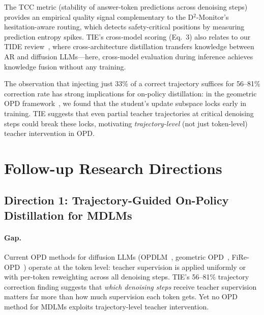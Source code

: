 \documentclass[11pt,a4paper]{article}
\begin{document}
The TCC metric (stability of answer-token predictions across denoising steps) provides an empirical quality signal complementary to the D$^2$-Monitor's~\cite{liu2026d2monitor} hesitation-aware routing, which detects safety-critical positions by measuring prediction entropy spikes. TIE's cross-model scoring (Eq.~3) also relates to our TIDE review~\cite{li2026tide}, where cross-architecture distillation transfers knowledge between AR and diffusion LLMs---here, cross-model evaluation during inference achieves knowledge fusion without any training.

The observation that injecting just 33\% of a correct trajectory suffices for 56--81\% correction rate has strong implications for on-policy distillation: in the geometric OPD framework~\cite{shen2026geometry}, we found that the student's update subspace locks early in training. TIE suggests that even partial teacher trajectories at critical denoising steps could break these locks, motivating \emph{trajectory-level} (not just token-level) teacher intervention in OPD.

\section{Follow-up Research Directions}

\subsection{Direction 1: Trajectory-Guided On-Policy Distillation for MDLMs}

\paragraph{Gap.} Current OPD methods for diffusion LLMs (OPDLM~\cite{ye2026opdlm}, geometric OPD~\cite{shen2026geometry}, FiRe-OPD~\cite{li2026fireopd}) operate at the token level: teacher supervision is applied uniformly or with per-token reweighting across all denoising steps. TIE's 56--81\% trajectory correction finding suggests that \emph{which denoising steps} receive teacher supervision matters far more than how much supervision each token gets. Yet no OPD method for MDLMs exploits trajectory-level teacher intervention.
\end{document}
